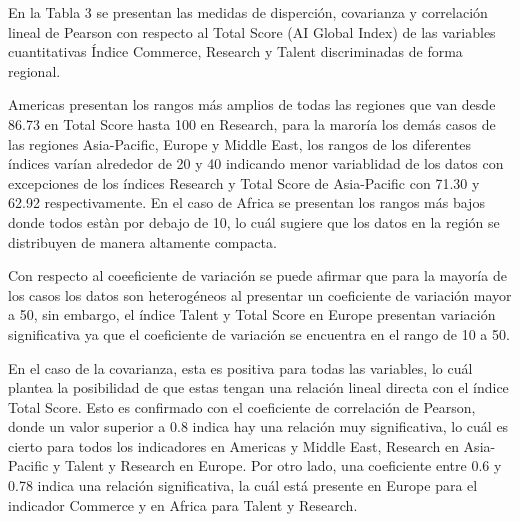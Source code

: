 \documentclass[
]{article}
\begin{document}
\begin{multicols}{2}

En la Tabla 3 se presentan las medidas de disperción, covarianza y correlación lineal de Pearson con respecto al Total Score (AI Global Index) de las variables cuantitativas Índice Commerce, Research y Talent discriminadas de forma regional. 

Americas presentan los rangos más amplios de todas las regiones que van desde 86.73 en Total Score hasta 100 en Research, para la maroría los demás casos de las regiones Asia-Pacific, Europe y Middle East, los rangos de los diferentes índices varían alrededor de 20 y 40 indicando menor variablidad de los datos con excepciones de los índices Research y Total Score de Asia-Pacific con 71.30 y  62.92 respectivamente. En el caso de Africa se presentan los rangos más bajos donde todos estàn por debajo de 10, lo cuál sugiere que los datos en la región se distribuyen de manera altamente compacta.

Con respecto al coeeficiente de variación se puede afirmar que para la mayoría de los casos los datos son heterogéneos al presentar un coeficiente de variación mayor a 50, sin embargo, el índice Talent y Total Score en Europe presentan variación significativa ya que el coeficiente de variación se encuentra en el rango de 10 a 50.

En el caso de la covarianza, esta es positiva para todas las variables, lo cuál plantea la posibilidad de que estas tengan una relación lineal directa con el índice Total Score. Esto es confirmado con el coeficiente de correlación de Pearson, donde un valor superior a 0.8 indica hay una relación muy significativa, lo cuál es cierto para todos los indicadores en Americas y Middle East, Research en Asia-Pacific y Talent y Research en Europe. Por otro lado, una coeficiente entre 0.6 y 0.78 indica una relación significativa, la cuál está presente en Europe para el indicador Commerce y en Africa para Talent y Research.


\end{multicols}
\end{document}
